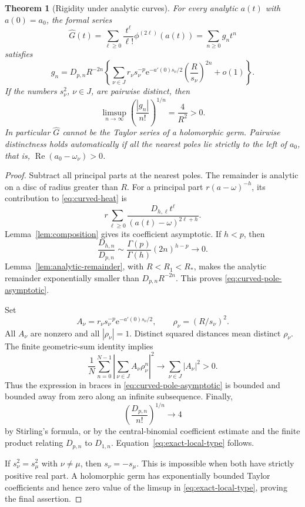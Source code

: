 \documentclass[11pt,a4paper]{article}
\numberwithin{equation}{section}
\newtheorem{theorem}{Theorem}[section]
\theoremstyle{definition}
\theoremstyle{remark}
\newcommand{\ee}{\mathrm e}
\newcommand{\Ree}{\operatorname{Re}}
\begin{document}
\begin{theorem}[Rigidity under analytic curves]
\label{thm:rigidity}
For every analytic $a(t)$ with $a(0)=a_0$, the formal series
\begin{equation}
 \widehat G(t)=\sum_{\ell\ge0}\frac{t^\ell}{\ell!}
                    \phi^{(2\ell)}(a(t))
       =\sum_{n\ge0}g_nt^n
 \label{eq:curved-heat}
\end{equation}
satisfies
\begin{equation}
 g_n=D_{p,n}R^{-2n}
   \left\{\sum_{\nu\in J}
       r_\nu s_\nu^{-p}\ee^{-a'(0)s_\nu/2}
       \left(\frac{R}{s_\nu}\right)^{2n}+o(1)\right\}.
 \label{eq:curved-pole-asymptotic}
\end{equation}
If the numbers $s_\nu^2$, $\nu\in J$, are pairwise distinct, then
\begin{equation}
 \limsup_{n\to\infty}
      \left(\frac{|g_n|}{n!}\right)^{1/n}
       =\frac4{R^2}>0.
 \label{eq:exact-local-type}
\end{equation}
In particular $\widehat G$ cannot be the Taylor series of a holomorphic
germ.  Pairwise distinctness holds automatically if all the nearest
poles lie strictly to the left of $a_0$, that is,
$\Ree(a_0-\omega_\nu)>0$.
\end{theorem}

\begin{proof}
Subtract all principal parts at the nearest poles.  The remainder is
analytic on a disc of radius greater than $R$.
For a principal part $r(a-\omega)^{-h}$, its contribution to
\eqref{eq:curved-heat} is
\[
 r\sum_{\ell\ge0}
       \frac{D_{h,\ell}t^\ell}{(a(t)-\omega)^{2\ell+h}}.
\]
Lemma~\ref{lem:composition} gives its coefficient asymptotic.  If
$h<p$, then
\[
 \frac{D_{h,n}}{D_{p,n}}
       \sim\frac{\Gamma(p)}{\Gamma(h)}(2n)^{h-p}\longrightarrow0.
\]
Lemma~\ref{lem:analytic-remainder}, with $R<R_1<R_*$, makes the analytic
remainder exponentially smaller than $D_{p,n}R^{-2n}$.
This proves \eqref{eq:curved-pole-asymptotic}.

Set
\[
 A_\nu=r_\nu s_\nu^{-p}\ee^{-a'(0)s_\nu/2},\qquad
 \rho_\nu=(R/s_\nu)^2.
\]
All $A_\nu$ are nonzero and all $|\rho_\nu|=1$.  Distinct squared
distances mean distinct $\rho_\nu$.  The finite geometric-sum identity
implies
\begin{equation}
 \frac1N\sum_{n=0}^{N-1}
       \left|\sum_{\nu\in J}A_\nu\rho_\nu^n\right|^2
     \longrightarrow\sum_{\nu\in J}|A_\nu|^2>0.
 \label{eq:cesaro}
\end{equation}
Thus the expression in braces in
\eqref{eq:curved-pole-asymptotic} is bounded and bounded away from zero
along an infinite subsequence.  Finally,
\[
 \left(\frac{D_{p,n}}{n!}\right)^{1/n}\longrightarrow4
\]
by Stirling's formula, or by the central-binomial coefficient estimate
and the finite product relating $D_{p,n}$ to $D_{1,n}$.
Equation~\eqref{eq:exact-local-type} follows.

If $s_\nu^2=s_\mu^2$ with $\nu\ne\mu$, then
$s_\nu=-s_\mu$.  This is impossible when both have strictly positive
real part.  A holomorphic germ has exponentially bounded Taylor
coefficients and hence zero value of the limsup in
\eqref{eq:exact-local-type}, proving the final assertion.
\end{proof}
\end{document}

